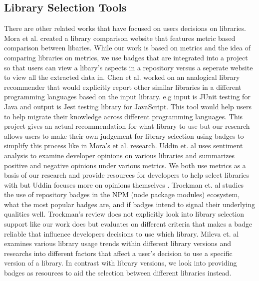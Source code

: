 \documentclass[12pt, letterpaper]{article}
\begin{document}
\subsection{Library Selection Tools}
There are other related works that have focused on users decisions on libraries. 
Mora et al. \cite{metrics, empiricalmetrics} created a library comparison website
that features metric based comparison between libaries. While our work is based on
metrics and the idea of comparing libraries on metrics, we use badges that are integrated into
a project so that users can view a libary's aspects in a repository versus a seperate
website to view all the extracted data in. 
Chen et al. \cite{analogical} worked on an analogical library recommender that would explicitly
report other similar libraries in a different programming languages based on the input library.
e.g input is JUnit testing for Java and output is Jest testing library for JavaScript. 
This tool would help users to help migrate their knowledge across different programming languages.
This project gives an actual recommendation for what library to use but our research allows users to
make their own judgement for library selection using badges to simplify this process like in
Mora's et al. \cite{metrics, empiricalmetrics} research.
Uddin et. al \cite{opinerarticle} uses sentiment analysis to examine developer opinions on various libraries
and summarizes positive and negative opinions under various metrics. We both use metrics as a basis of
our research and provide resources for developers to help select libraries with but Uddin focuses more on
opinions themselves \cite{stackoverflow}.
Trockman et. al \cite{githubbadges} studies the use of repository badges in the NPM (node package modules)
ecosystem, what the most popular badges are, and if badges intend to signal their underlying qualities well.
Trockman's review does not explicitly look into library selection support like our work does but 
evaluates on different criteria that makes a badge reliable that influence developers decisions
to use which library. Mileva et. al \cite{librarytrends} examines various library usage trends 
within different library versions and researchs into different factors that affect a user's decision
to use a specific version of a library. In contrast with library versions, we look into providing badges
as resources to aid the selection between different libraries instead.


\end{document}
